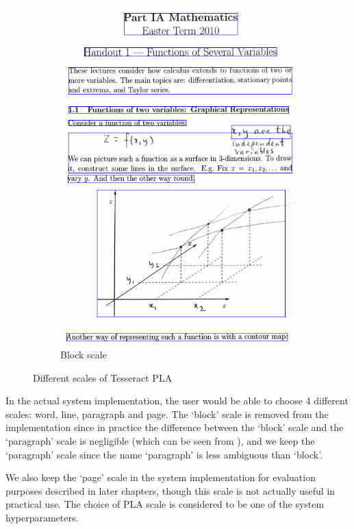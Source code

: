\begin{figure}[!ht]
\begin{subfigure}{.42\textwidth}
    \includegraphics[width=\textwidth]{pla-block.png}
    \caption{Block scale}
  \end{subfigure}
  \caption{Different scales of Tesseract PLA}
  \label{fig:tess-pla-scales}
\end{figure}

In the actual system implementation, the user would be able to choose 4 different scales: word, line, paragraph and page. The `block' scale is removed from the implementation since in practice the difference between the `block' scale and the `paragraph' scale is negligible (which can be seen from ), and we keep the `paragraph' scale since the name `paragraph' is less ambiguous than `block'. 

We also keep the `page' scale in the system implementation for evaluation purposes described in later chapters, though this scale is not actually useful in practical use. The choice of PLA scale is considered to be one of the system hyperparameters.

